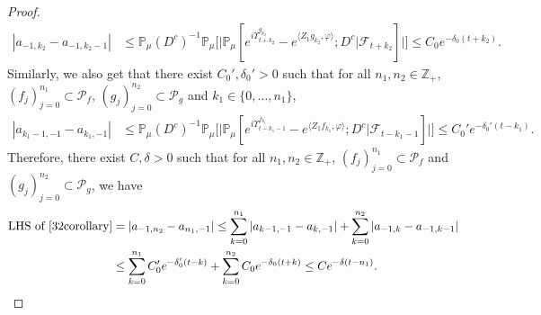 \documentclass[12pt,a4paper]{amsart}
\theoremstyle{plain}
\theoremstyle{definition}
\numberwithin{equation}{section}
\begin{document}
\begin{proof}
\begin{align}
    | a_{-1,k_2} - a_{-1,k_2-1}|
    & \leq \mathbb{P}_{\mu}(D^c)^{-1}\mathbb{P}_{\mu}\Big[\big|\mathbb P_\mu[e^{i\Upsilon^{g_{k_2}}_{t+k_2}}-e^{\langle Z_1g_{k_2}, \varphi\rangle}; D^c|\mathscr F_{t+k_2}]\big|\Big]
    \leq C_0 e^{-\delta_0 (t+k_2)}.
\end{align}
Similarly,  we also get that there exist $C_0',\delta_0' >0$ such that for all $n_1,n_2 \in \mathbb Z_+$, $(f_j)_{j=0}^{n_1}\subset \mathcal P_f$, $(g_j)_{j=0}^{n_2}\subset \mathcal P_g$ and $k_1 \in \{0,\dots,n_1\}$,
\begin{align}
    | a_{k_1-1,-1} - a_{k_1,-1}|
    & \leq \mathbb{P}_{\mu}(D^c)^{-1}\mathbb{P}_{\mu}\Big[\big|\mathbb P_\mu[e^{i\Upsilon^{f_{k_1}}_{t-k_1-1}}-e^{\langle Z_1f_{k_1}, \varphi\rangle}; D^c|\mathscr F_{t-k_1-1}]\big|\Big]
    \leq C_0' e^{-\delta_0' (t-k_1)}.
\end{align}
  Therefore, there exist $C,\delta >0$ such that for all $n_1,n_2 \in \mathbb Z_+$, $(f_j)_{j=0}^{n_1}\subset \mathcal P_f$ and $(g_j)_{j=0}^{n_2}\subset \mathcal P_g$, we have
  \begin{align}
    \text{LHS of \eqref{32corollary}}
    & = \left|a_{-1,n_2}-a_{n_1,-1}\right|
      \leq \sum_{k=0}^{n_1}\left|a_{k-1,-1}-a_{k,-1}\right|+\sum_{k=0}^{n_2}\left|a_{-1,k}-a_{-1,k-1}\right|\\
     & \leq \sum_{k=0}^{n_1} C_0' e^{-\delta_0' (t-k)}+\sum_{k=0}^{n_2} C_0 e^{-\delta_0 (t+k)}
      \leq C e^{- \delta (t-n_1)}.
      \qedhere
  \end{align}
\end{proof}
\end{document}

